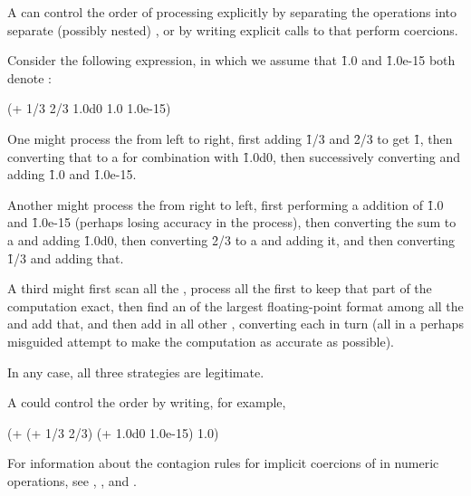 A  can control the order of processing explicitly by 
separating the operations into separate (possibly nested) ,
or by writing explicit calls to  that perform coercions.


Consider the following expression, in which we assume that \f{1.0} and
\f{1.0e-15} both denote :

\code
 (+ 1/3 2/3 1.0d0 1.0 1.0e-15)
\endcode

One  might
process the  from left to right,
first adding \f{1/3} and \f{2/3} to get \f{1}, 
then converting that to a  
for combination with \f{1.0d0},
then successively converting and adding \f{1.0} and \f{1.0e-15}.

Another  might process the  from
right to left, first performing a  addition of \f{1.0} and
\f{1.0e-15} (perhaps losing accuracy in the process), then converting the sum to 
a  and adding \f{1.0d0}, then converting \f{2/3} to a
 and adding it, and then converting \f{1/3} and adding that.

A third  might first scan all the ,
process all the  first to keep that part of the computation exact,
then find an  of the largest floating-point format among all the
 and add that, and then add in all other , converting
each in turn (all in a perhaps misguided attempt to make the computation as accurate
as possible).

In any case, all three strategies are legitimate.

A  could control the order by writing, for example,

\code
 (+ (+ 1/3 2/3) (+ 1.0d0 1.0e-15) 1.0)
\endcode

\endsubsubsubsection%

\endsubsubsection%


For information about the contagion rules for implicit coercions of  
in numeric operations, see
     \secref\RuleOfFloatPrecisionContagion, 
     \secref\RuleOfFloatAndRationalContagion,
 and \secref\RuleOfComplexContagion.

